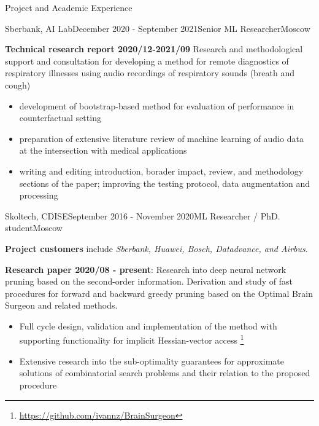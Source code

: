 \documentclass{resume} %
\begin{document}
\begin{rSection}{Project and Academic Experience}
\begin{rSubsection}{Sberbank, AI Lab}{December 2020 - September 2021}{Senior ML Researcher}{Moscow}
    \item \textbf{Technical research report 2020/12-2021/09}
    Research and methodological support and consultation for developing a method for remote
    diagnostics of respiratory illnesses using audio recordings of respiratory sounds (breath
    and cough)
    \begin{itemize}
        \item development of bootstrap-based method for evaluation of performance in
        counterfactual setting  %
        \item preparation of extensive literature review of machine learning of audio data
        at the intersection with medical applications
        \item writing and editing introduction, borader impact, review, and methodology sections 
        of the paper; improving the testing protocol, data augmentation and processing
    \end{itemize}
\end{rSubsection}

\begin{rSubsection}{Skoltech, CDISE}{September 2016 - November 2020}{ML Researcher / PhD. student}{Moscow}
    \item \textbf{Project customers} include \emph{Sberbank, Huawei, Bosch, Datadvance, and Airbus}.

    \bigskip
    \item \textbf{Research paper 2020/08 - present}:
    Research into deep neural network pruning based on the second-order information.
    Derivation and study of fast procedures for forward and backward greedy pruning based
    on the Optimal Brain Surgeon and related methods.
    \begin{itemize}
        \item Full cycle design, validation and implementation of the method with supporting
        functionality for implicit Hessian-vector access%
            \footnote{\url{https://github.com/ivannz/BrainSurgeon}}

        \item Extensive research into the sub-optimality guarantees for approximate solutions
        of combinatorial search problems and their relation to the proposed procedure
    \end{itemize}


\end{rSubsection}
\end{rSection}
\end{document}
